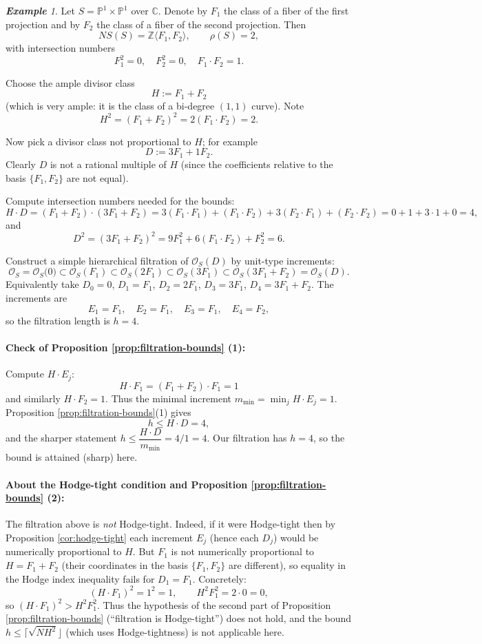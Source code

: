 \documentclass[14pt]{amsart}
\theoremstyle{plain}
\theoremstyle{definition}
\theoremstyle{remark}
\newtheorem{exam}[thm]{\bf Example}
\theoremstyle{example}
\def \P{\mathbb{P}}
\def \Z{\mathbb{Z}}
\def \O{\mathcal{O}}
\begin{document}
\begin{exam}

Let $S=\P^1\times\P^1$ over $\mathbb{C}$. Denote by
$F_1$ the class of a fiber of the first projection and by $F_2$ the class
of a fiber of the second projection. Then
$$
NS(S)=\Z\langle F_1, F_2\rangle,\qquad \rho(S)=2,
$$
with intersection numbers
$$
F_1^2=0,\quad F_2^2=0,\quad F_1\cdot F_2=1 .
$$

Choose the ample divisor class
$$
H := F_1 + F_2
$$
(which is very ample: it is the class of a bi-degree $(1,1)$ curve). Note
$$
H^2 = (F_1+F_2)^2 = 2(F_1\cdot F_2)=2.
$$

Now pick a divisor class not proportional to $H$; for example
$$
D := 3F_1 + 1F_2.
$$
Clearly $D$ is not a rational multiple of $H$ (since the coefficients relative to the basis $\{F_1,F_2\}$ are not equal).

Compute intersection numbers needed for the bounds:
$$
H\cdot D = (F_1+F_2)\cdot(3F_1+F_2)
=3(F_1\cdot F_1)+(F_1\cdot F_2)+3(F_2\cdot F_1)+(F_2\cdot F_2)
=0+1+3\cdot 1+0=4,
$$
and
$$
D^2=(3F_1+F_2)^2 = 9F_1^2 + 6(F_1\cdot F_2)+F_2^2=6.
$$

Construct a simple hierarchical filtration of $\O_S(D)$ by unit-type increments:
$$
\O_S=\O_S\bigl(0\bigr)\subset \O_S(F_1)\subset \O_S(2F_1)\subset \O_S(3F_1)\subset \O_S(3F_1+F_2) = \O_S(D).
$$
Equivalently take $D_0=0$, $D_1=F_1$, $D_2=2F_1$, $D_3=3F_1$, $D_4=3F_1+F_2$.
The increments are
$$
E_1=F_1,\quad E_2=F_1,\quad E_3=F_1,\quad E_4=F_2,
$$
so the filtration length is $h=4$.

\paragraph{Check of Proposition \ref{prop:filtration-bounds} (1):}
Compute $H\cdot E_j$:
$$
H\cdot F_1=(F_1+F_2)\cdot F_1=1
$$
and similarly $H\cdot F_2=1$. Thus the minimal increment $m_{\min}=\min_j H\cdot E_j =1$.
Proposition \ref{prop:filtration-bounds}(1) gives
$$
h \le H\cdot D = 4,
$$
and the sharper statement $h\le \dfrac{H\cdot D}{m_{\min}} = 4/1 =4$.
Our filtration has $h=4$, so the bound is attained (sharp) here.

\paragraph{About the Hodge-tight condition and Proposition \ref{prop:filtration-bounds} (2):}
The filtration above is \emph{not} Hodge-tight. Indeed, if it were Hodge-tight then by Proposition \ref{cor:hodge-tight} each increment $E_j$ (hence each $D_j$) would be numerically proportional to $H$. But $F_1$ is not numerically proportional to $H=F_1+F_2$ (their coordinates in the basis $\{F_1,F_2\}$ are different), so equality in the Hodge index inequality fails for $D_1=F_1$. Concretely:
$$
(H\cdot F_1)^2 = 1^2 =1,\qquad H^2 F_1^2 = 2\cdot 0 =0,
$$
so $(H\cdot F_1)^2 > H^2 F_1^2$. Thus the hypothesis of the second part of Proposition \ref{prop:filtration-bounds} (``filtration is Hodge-tight'') does not hold, and the bound $h\le\lceil\sqrt{N H^2}\rfloor$ (which uses Hodge-tightness) is not applicable here.
\end{exam}
\end{document}
